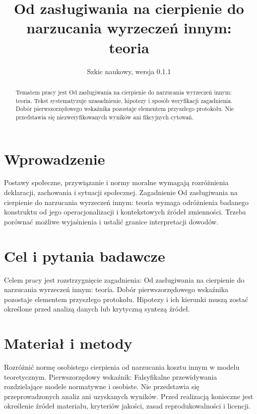 \documentclass[11pt,a4paper]{article}
\title{Od zasługiwania na cierpienie do narzucania wyrzeczeń innym: teoria}
\author{}
\date{Szkic naukowy, wersja 0.1.1}
\begin{document}
\maketitle

\begin{abstract}

Tematem pracy jest Od zasługiwania na cierpienie do narzucania wyrzeczeń innym: teoria. Tekst systematyzuje uzasadnienie, hipotezy i sposób weryfikacji zagadnienia. Dobór pierwszorzędowego wskaźnika pozostaje elementem przyszłego protokołu. Nie przedstawia się niezweryfikowanych wyników ani fikcyjnych cytowań.

\end{abstract}

\section{Wprowadzenie}

Postawy społeczne, przywiązanie i normy moralne wymagają rozróżnienia deklaracji, zachowania i sytuacji społecznej. Zagadnienie Od zasługiwania na cierpienie do narzucania wyrzeczeń innym: teoria wymaga odróżnienia badanego konstruktu od jego operacjonalizacji i kontekstowych źródeł zmienności. Trzeba porównać możliwe wyjaśnienia i ustalić granice interpretacji dowodów.

\section{Cel i pytania badawcze}

Celem pracy jest rozstrzygnięcie zagadnienia: Od zasługiwania na cierpienie do narzucania wyrzeczeń innym: teoria. Dobór pierwszorzędowego wskaźnika pozostaje elementem przyszłego protokołu. Hipotezy i ich kierunki muszą zostać określone przed analizą danych lub krytyczną syntezą źródeł.

\section{Materiał i metody}

Rozróżnić normę osobistego cierpienia od narzucania kosztu innym w modelu teoretycznym. Pierwszorzędowy wskaźnik: Falsyfikalne przewidywania rozdzielające modele normatywne i osobiste. Nie przedstawia się przeprowadzonych analiz ani uzyskanych wyników. Przed realizacją konieczne jest określenie źródeł materiału, kryteriów jakości, zasad reprodukowalności i licencji.
\end{document}
